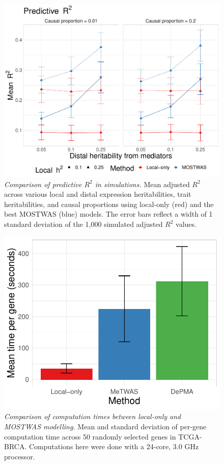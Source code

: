 \documentclass[11pt]{article}
\begin{document}
\begin{center}
\begin{figure}[!h]
    \includegraphics[width=\textwidth]{figures/ch4_suppfig1.pdf}
    \caption{\emph{Comparison of predictive $R^2$ in simulations.}
    Mean adjusted $R^2$ across various local and distal expression
    heritabilities, trait heritabilities,
    and causal proportions using local-only (red)
    and the best MOSTWAS (blue) models. The error bars
    reflect a width of 1 standard deviation
    of the 1,000 simulated adjusted $R^2$ values.}
    \label{fig:ch4_suppfig1}
\end{figure}
\end{center}

\begin{center}
\begin{figure}[!h]
    \includegraphics[width=.9\textwidth]{figures/ch4_suppfig0.pdf}
    \caption{\emph{Comparison of computation times
    between local-only and MOSTWAS modelling.}
    Mean and standard deviation of per-gene computation time
    across 50 randomly selected genes in TCGA-BRCA.
    Computations here were done with a 24-core,
    3.0 GHz processor.}
    \label{fig:ch4_suppfig0}
\end{figure}
\end{center} 
\end{document}
